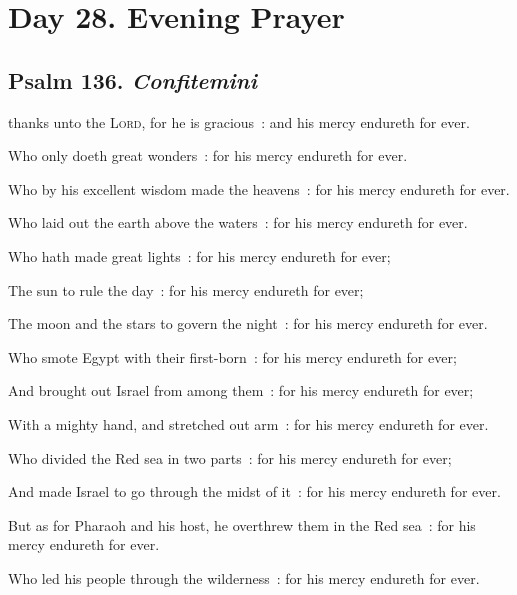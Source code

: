 \clearpage
\section*{Day 28. Evening Prayer}


\subsection{Psalm 136. \textit{Confitemini}}


 thanks unto the \textsc{Lord}, for he is gracious~: and his mercy endureth for ever.\par
{}
Who only doeth great wonders~: for his mercy endureth for ever.\par
{}Who by his excellent wisdom made the heavens~: for his mercy endureth for ever.\par
{}Who laid out the earth above the waters~: for his mercy endureth for ever.\par
{}Who hath made great lights~: for his mercy endureth for ever;\par
{}The sun to rule the day~: for his mercy endureth for ever;\par
{}The moon and the stars to govern the night~: for his mercy endureth for ever.\par
{}Who smote Egypt with their first-born~: for his mercy endureth for ever;\par
{}And brought out Israel from among them~: for his mercy endureth for ever;\par
{}With a mighty hand, and stretched out arm~: for his mercy endureth for ever.\par
{}Who divided the Red sea in two parts~: for his mercy endureth for ever;\par
{}And made Israel to go through the midst of it~: for his mercy endureth for ever.\par
{}But as for Pharaoh and his host, he overthrew them in the Red sea~: for his mercy endureth for ever.\par
{}Who led his people through the wilderness~: for his mercy endureth for ever.\par

